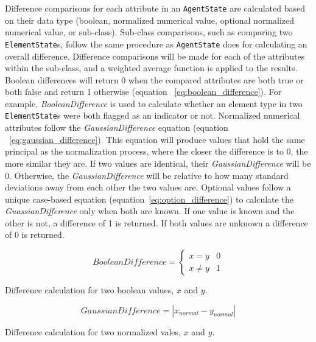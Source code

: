 Difference comparisons for each attribute in an \texttt{AgentState} are calculated based on their data type (boolean, normalized numerical value, optional normalized numerical value, or sub-class).
Sub-class comparisons, such as comparing two \texttt{ElementState}s, follow the same procedure as \texttt{AgentState} does for calculating an overall difference.
Difference comparisons will be made for each of the attributes within the sub-class, and a weighted average function is applied to the results.
Boolean differences will return 0 when the compared attributes are both true or both false and return 1 otherwise (equation ~\ref{eq:boolean_difference}).
For example, \textit{BooleanDifference} is used to calculate whether an element type in two \texttt{ElementState}s were both flagged as an indicator or not.
Normalized numerical attributes follow the \textit{GaussianDifference} equation (equation ~\ref{eq:gaussian_difference}).
This equation will produce values that hold the same principal as the normalization process, where the closer the difference is to 0, the more similar they are.
If two values are identical, their \textit{GaussianDifference} will be 0.
Otherwise, the \textit{GaussianDifference} will be relative to how many standard deviations away from each other the two values are.
Optional values follow a unique case-based equation (equation~\ref{eq:option_difference}) to calculate the \textit{GuassianDifference} only when both are known.
If one value is known and the other is not, a difference of 1 is returned.
If both values are unknown a difference of 0 is returned.

\begin{capeq}
\begin{equation} \label{eq:boolean_difference}
  BooleanDifference = \begin{cases}
    x = y & 0 \\
    x \neq y & 1
  \end{cases}
\end{equation}
\caption{Difference calculation for two boolean values, $x$ and $y$.}
\end{capeq}

\begin{capeq}
\begin{equation} \label{eq:gaussian_difference}
  GaussianDifference = |x_{normal} - y_{normal}|
\end{equation}
\caption{Difference calculation for two normalized vales, $x$ and $y$.}
\end{capeq}

